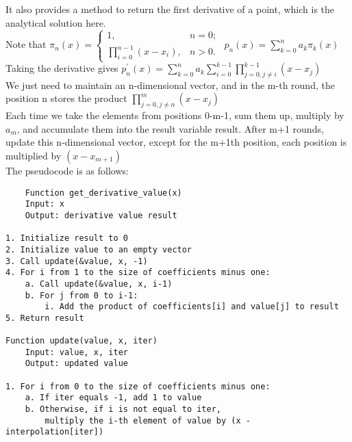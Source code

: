 \documentclass[a4paper]{article}
\begin{document}
It also provides a method to return the first derivative of a point, which is the analytical solution here. \\
Note that
\(\pi_n(x) = \begin{cases}
    1, & n = 0; \\
    \prod_{i=0}^{n-1}(x - x_i), & n > 0.
\end{cases}\)
$p_n(x) = \sum_{k=0}^{n} a_k \pi_k(x)$ \\
Taking the derivative gives $p_n^{'}(x) = \sum_{k=0}^{n} a_k\sum_{i=0}^{k-1}\prod_{j=0,j\neq i}^{k-1}(x - x_j)$ \\
We just need to maintain an n-dimensional vector, and in the m-th round, the position n stores the product $\prod_{j=0,j\neq n}^{m}(x - x_j)$ \\
Each time we take the elements from positions 0-m-1, sum them up, multiply by $a_m$, and accumulate them into the result variable result. After m+1 rounds, update this n-dimensional vector, except for the m+1th position, each position is multiplied by $(x-x_{m+1})$ \\
The pseudocode is as follows:
\begin{verbatim}
    Function get_derivative_value(x)
    Input: x
    Output: derivative value result

1. Initialize result to 0
2. Initialize value to an empty vector
3. Call update(&value, x, -1)
4. For i from 1 to the size of coefficients minus one:
    a. Call update(&value, x, i-1)
    b. For j from 0 to i-1:
        i. Add the product of coefficients[i] and value[j] to result
5. Return result

Function update(value, x, iter)
    Input: value, x, iter
    Output: updated value

1. For i from 0 to the size of coefficients minus one:
    a. If iter equals -1, add 1 to value
    b. Otherwise, if i is not equal to iter, 
        multiply the i-th element of value by (x - interpolation[iter])
\end{verbatim}
\end{document}
